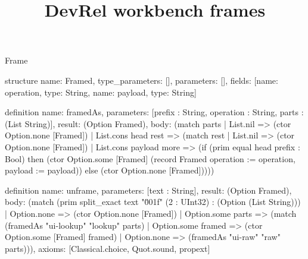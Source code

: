 \begin{lexlean}{Frame}
\title{DevRel workbench frames}
\begin{semanticmodule}
structure{
  name: Framed,
  type_parameters: [],
  parameters: [],
  fields: [{name: operation, type: String}, {name: payload, type: String}]
}

definition{
  name: framedAs,
  parameters: [prefix : String, operation : String, parts : (List String)],
  result: (Option Framed),
  body: (match parts
    | List.nil => (ctor Option.none [Framed])
    | List.cons head rest => (match rest
      | List.nil => (ctor Option.none [Framed])
      | List.cons payload more => (if (prim equal head prefix : Bool) then (ctor Option.some [Framed] (record Framed {operation := operation, payload := payload})) else (ctor Option.none [Framed]))))
}

definition{
  name: unframe,
  parameters: [text : String],
  result: (Option Framed),
  body: (match (prim split_exact text "\u001f" (2 : UInt32) : (Option (List String)))
    | Option.none => (ctor Option.none [Framed])
    | Option.some parts => (match (framedAs "ui-lookup" "lookup" parts)
      | Option.some framed => (ctor Option.some [Framed] framed)
      | Option.none => (framedAs "ui-raw" "raw" parts))),
  axioms: [Classical.choice, Quot.sound, propext]
}


\end{semanticmodule}
\end{lexlean}
